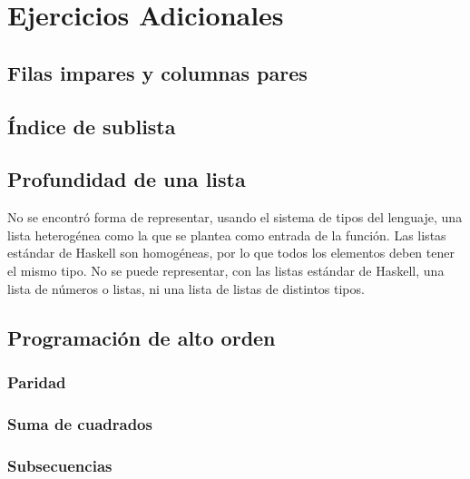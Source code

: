 \documentclass[12pt]{article}
\begin{document}
\tableofcontents

\clearpage

\section{Ejercicios Adicionales}

\subsection{Filas impares y columnas pares}



\subsection{Índice de sublista}



\subsection{Profundidad de una lista}

No se encontró forma de representar, usando el sistema de tipos del lenguaje,
una lista heterogénea como la que se plantea como entrada de la función. Las
listas estándar de Haskell son homogéneas, por lo que todos los elementos deben
tener el mismo tipo. No se puede representar, con las listas estándar de
Haskell, una lista de números o listas, ni una lista de listas de distintos
tipos.

\subsection{Programación de alto orden}

\subsubsection{Paridad}



\subsubsection{Suma de cuadrados}



\subsubsection{Subsecuencias}
\end{document}
